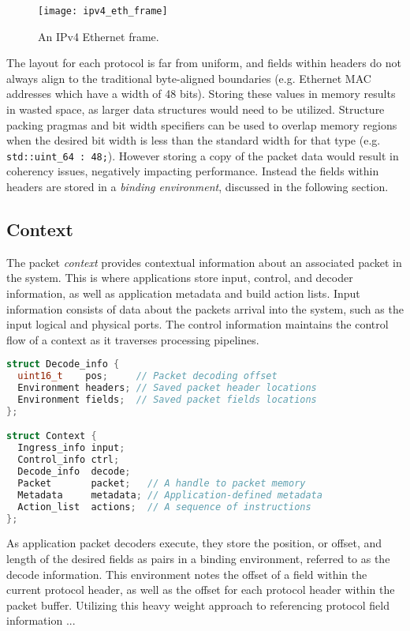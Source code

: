 \begin{figure}[h]
\centering
\texttt{[image: ipv4\_eth\_frame]}
\caption{An IPv4 Ethernet frame.}
\label{ipv4_eth_frame}
\end{figure}

The layout for each protocol is far from uniform, and fields within headers do
not always align to the traditional byte-aligned boundaries (e.g. Ethernet
MAC addresses which have a width of 48 bits). Storing these values in memory
results in wasted space, as larger data structures would need to be utilized.
Structure packing pragmas and bit width specifiers can be used to overlap
memory regions when the desired bit width is less than the standard width for
that type (e.g. \lstinline{std::uint_64 : 48;}). However storing a copy of the
packet data would result in coherency issues, negatively impacting
performance. Instead the fields within headers are stored in a \emph{binding
environment}, discussed in the following section.

\subsection{Context}
The packet \emph{context} provides contextual information about an associated
packet in the system. This is where applications store input, control, and
decoder information, as well as application metadata and build action lists.
Input information consists of data about the packets arrival into the system,
such as the input logical and physical ports. The control information maintains
the control flow of a context as it traverses processing pipelines.

\lstset{basicstyle=\tiny}
\begin{lstlisting}[language=c++]
struct Decode_info {
  uint16_t    pos;     // Packet decoding offset
  Environment headers; // Saved packet header locations
  Environment fields;  // Saved packet fields locations
};

struct Context {
  Ingress_info input;
  Control_info ctrl;
  Decode_info  decode;
  Packet       packet;   // A handle to packet memory
  Metadata     metadata; // Application-defined metadata
  Action_list  actions;  // A sequence of instructions
};
\end{lstlisting}

As application packet decoders execute, they store the position, or offset, and
length of the desired fields as pairs in a binding environment, referred to as
the decode information. This environment notes the offset of a field within the
current protocol header, as well as the offset for each protocol header within
the packet buffer. Utilizing this heavy weight approach to referencing protocol
field information ...

